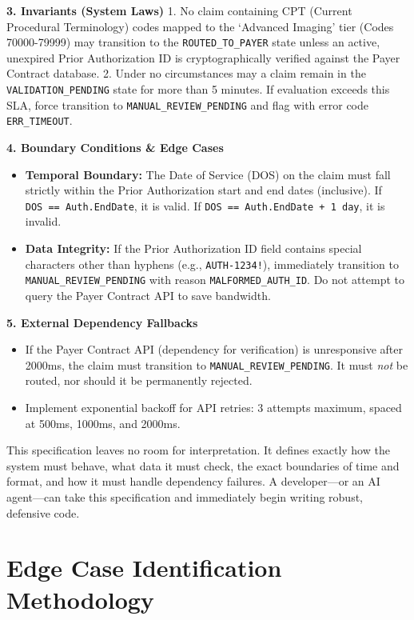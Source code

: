 \textbf{3. Invariants (System Laws)} 1. No claim containing CPT (Current
Procedural Terminology) codes mapped to the `Advanced Imaging' tier
(Codes 70000-79999) may transition to the \texttt{ROUTED\_TO\_PAYER}
state unless an active, unexpired Prior Authorization ID is
cryptographically verified against the Payer Contract database. 2. Under
no circumstances may a claim remain in the \texttt{VALIDATION\_PENDING}
state for more than 5 minutes. If evaluation exceeds this SLA, force
transition to \texttt{MANUAL\_REVIEW\_PENDING} and flag with error code
\texttt{ERR\_TIMEOUT}.

\textbf{4. Boundary Conditions \& Edge Cases}

\begin{itemize}
\tightlist
\item
  \textbf{Temporal Boundary:} The Date of Service (DOS) on the claim
  must fall strictly within the Prior Authorization start and end dates
  (inclusive). If \texttt{DOS\ ==\ Auth.EndDate}, it is valid. If
  \texttt{DOS\ ==\ Auth.EndDate\ +\ 1\ day}, it is invalid.
\item
  \textbf{Data Integrity:} If the Prior Authorization ID field contains
  special characters other than hyphens (e.g., \texttt{AUTH-1234!}),
  immediately transition to \texttt{MANUAL\_REVIEW\_PENDING} with reason
  \texttt{MALFORMED\_AUTH\_ID}. Do not attempt to query the Payer
  Contract API to save bandwidth.
\end{itemize}

\textbf{5. External Dependency Fallbacks}

\begin{itemize}
\tightlist
\item
  If the Payer Contract API (dependency for verification) is
  unresponsive after 2000ms, the claim must transition to
  \texttt{MANUAL\_REVIEW\_PENDING}. It must \emph{not} be routed, nor
  should it be permanently rejected.
\item
  Implement exponential backoff for API retries: 3 attempts maximum,
  spaced at 500ms, 1000ms, and 2000ms.
\end{itemize}

This specification leaves no room for interpretation. It defines exactly
how the system must behave, what data it must check, the exact
boundaries of time and format, and how it must handle dependency
failures. A developer---or an AI agent---can take this specification and
immediately begin writing robust, defensive code.

\section{Edge Case Identification
Methodology}\label{edge-case-identification-methodology}

